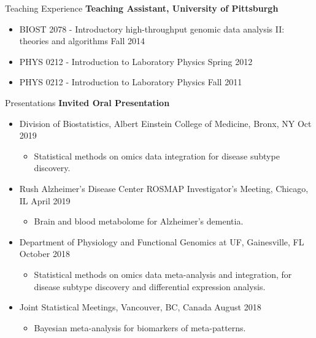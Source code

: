 \documentclass{resume} %
\begin{document}
\begin{rSection}{Teaching Experience }
\textbf{Teaching Assistant, University of Pittsburgh}
\begin{itemize}[noitemsep,topsep=0pt]
\item BIOST 2078 - Introductory high-throughput genomic data analysis II: \\theories and algorithms \hfill {Fall 2014}
\item PHYS 0212 - Introduction to Laboratory Physics \hfill {Spring 2012}
\item PHYS 0212 - Introduction to Laboratory Physics \hfill {Fall 2011}
\end{itemize}

\end{rSection}

\begin{rSection}{Presentations}
\textbf{Invited Oral Presentation}

\begin{itemize}[noitemsep,topsep=0pt]

\item  Division of Biostatistics,  Albert Einstein College of Medicine, Bronx, NY  \hfill {Oct 2019}
\begin{itemize}[noitemsep,topsep=0pt]
\item{Statistical methods on omics data integration for disease subtype discovery.}
\end{itemize}

\item  Rush Alzheimer's Disease Center ROSMAP Investigator's Meeting, Chicago, IL  \hfill {April 2019}
\begin{itemize}[noitemsep,topsep=0pt]
\item{Brain and blood metabolome for Alzheimer's dementia.}
\end{itemize}

\item  Department of Physiology and Functional Genomics at UF, Gainesville, FL  \hfill {October 2018}
\begin{itemize}[noitemsep,topsep=0pt]
\item{Statistical methods on omics data meta-analysis and integration, for \\
disease subtype discovery and differential expression analysis.}
\end{itemize}

\item  Joint Statistical Meetings, Vancouver, BC, Canada  \hfill {August 2018}
\begin{itemize}[noitemsep,topsep=0pt]
\item{Bayesian meta-analysis for biomarkers of meta-patterns.}
\end{itemize}


\end{itemize}
\end{rSection}
\end{document}
